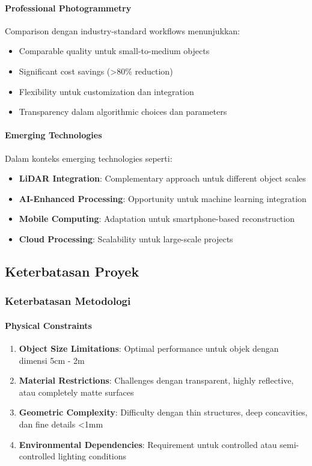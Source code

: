 \documentclass[12pt,a4paper]{article}
\begin{document}
\paragraph{Professional Photogrammetry}
Comparison dengan industry-standard workflows menunjukkan:

\begin{itemize}
    \item Comparable quality untuk small-to-medium objects
    \item Significant cost savings (>80\% reduction)
    \item Flexibility untuk customization dan integration
    \item Transparency dalam algorithmic choices dan parameters
\end{itemize}

\paragraph{Emerging Technologies}
Dalam konteks emerging technologies seperti:

\begin{itemize}
    \item \textbf{LiDAR Integration}: Complementary approach untuk different object scales
    \item \textbf{AI-Enhanced Processing}: Opportunity untuk machine learning integration
    \item \textbf{Mobile Computing}: Adaptation untuk smartphone-based reconstruction
    \item \textbf{Cloud Processing}: Scalability untuk large-scale projects
\end{itemize}

\subsection{Keterbatasan Proyek}

\subsubsection{Keterbatasan Metodologi}

\paragraph{Physical Constraints}
\begin{enumerate}
    \item \textbf{Object Size Limitations}: Optimal performance untuk objek dengan dimensi 5cm - 2m
    \item \textbf{Material Restrictions}: Challenges dengan transparent, highly reflective, atau completely matte surfaces
    \item \textbf{Geometric Complexity}: Difficulty dengan thin structures, deep concavities, dan fine details <1mm
    \item \textbf{Environmental Dependencies}: Requirement untuk controlled atau semi-controlled lighting conditions
\end{enumerate}
\end{document}
